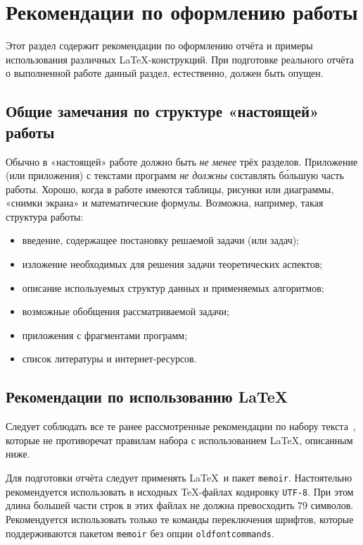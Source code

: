 \section{Рекомендации по оформлению работы}

Этот раздел содержит рекомендации по оформлению отчёта
и примеры использования различных \LaTeX-конструкций. При подготовке
реального отчёта о выполненной работе данный раздел, естественно, должен
быть опущен.

\subsection*{Общие замечания по структуре «настоящей» работы}

Обычно в «настоящей» работе должно быть \emph{не менее} трёх разделов.
Приложение
(или приложения) с текстами программ \emph{не должны} составлять б\'{о}льшую
часть работы. Хорошо, когда в работе имеются таблицы, рисунки или диаграммы,
«снимки экрана» и математические формулы. Возможна, например, такая 
структура работы:

\begin{itemize}
\item введение, содержащее постановку решаемой задачи (или задач);
\item изложение необходимых для решения задачи теоретических аспектов;
\item описание используемых структур данных и применяемых алгоритмов;
\item возможные обобщения рассматриваемой задачи;
\item приложения с фрагментами программ;
\item список литературы и интернет-ресурсов.
\end{itemize}

\subsection*{Рекомендации по использованию \LaTeX}

Следует соблюдать все те ранее рассмотренные рекомендации по набору
текста~\cite{russian-text}, которые не противоречат правилам набора с
использованием \LaTeX, описанным ниже.

Для подготовки отчёта следует применять \LaTeX\ и пакет 
\texttt{memoir}. Настоятельно рекомендуется использовать в исходных 
\TeX-файлах кодировку \texttt{UTF-8}. При этом длина большей части строк в 
этих файлах не должна превосходить 79 символов. Рекомендуется 
использовать только те команды переключения шрифтов, которые поддерживаются
пакетом \verb|memoir| без опции \verb|oldfontcommands|. 

